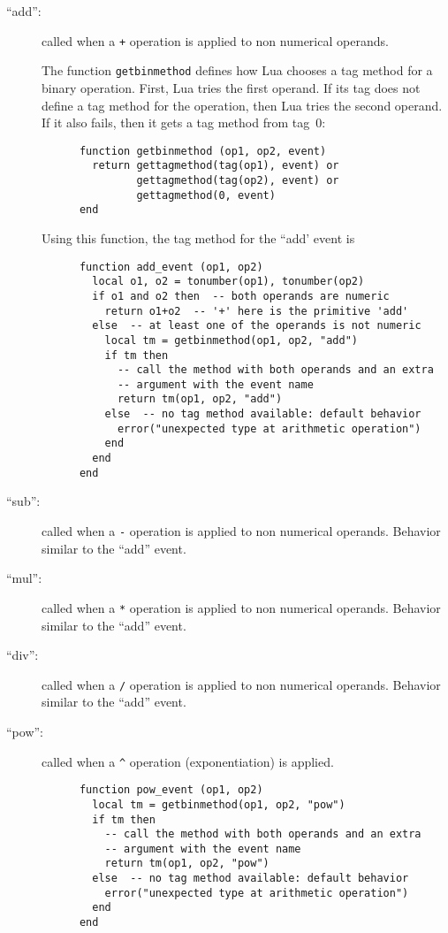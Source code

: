 \documentclass[11pt]{article}
\begin{document}
\begin{description}

\item[``add'':]
called when a \verb|+| operation is applied to non numerical operands.

The function \verb|getbinmethod| defines how Lua chooses a tag method
for a binary operation.
First, Lua tries the first operand.
If its tag does not define a tag method for the operation,
then Lua tries the second operand.
If it also fails, then it gets a tag method from tag~0:
\begin{verbatim}
      function getbinmethod (op1, op2, event)
        return gettagmethod(tag(op1), event) or
               gettagmethod(tag(op2), event) or
               gettagmethod(0, event)
      end
\end{verbatim}
Using this function,
the tag method for the ``add' event is
\begin{verbatim}
      function add_event (op1, op2)
        local o1, o2 = tonumber(op1), tonumber(op2)
        if o1 and o2 then  -- both operands are numeric
          return o1+o2  -- '+' here is the primitive 'add'
        else  -- at least one of the operands is not numeric
          local tm = getbinmethod(op1, op2, "add")
          if tm then
            -- call the method with both operands and an extra
            -- argument with the event name
            return tm(op1, op2, "add")
          else  -- no tag method available: default behavior
            error("unexpected type at arithmetic operation")
          end
        end
      end
\end{verbatim}

\item[``sub'':]
called when a \verb|-| operation is applied to non numerical operands.
Behavior similar to the ``add'' event.

\item[``mul'':]
called when a \verb|*| operation is applied to non numerical operands.
Behavior similar to the ``add'' event.

\item[``div'':]
called when a \verb|/| operation is applied to non numerical operands.
Behavior similar to the ``add'' event.

\item[``pow'':]
called when a \verb|^| operation (exponentiation) is applied.
\begin{verbatim}
      function pow_event (op1, op2)
        local tm = getbinmethod(op1, op2, "pow")
        if tm then
          -- call the method with both operands and an extra
          -- argument with the event name
          return tm(op1, op2, "pow")
        else  -- no tag method available: default behavior
          error("unexpected type at arithmetic operation")
        end
      end
\end{verbatim}


\end{description}
\end{document}

